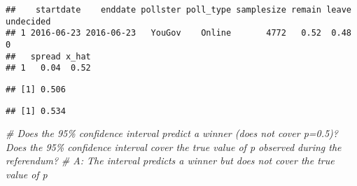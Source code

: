 \documentclass[
]{article}
\newenvironment{Shaded}{\begin{snugshade}}{\end{snugshade}}
\newcommand{\CommentTok}[1]{\textcolor[rgb]{0.56,0.35,0.01}{\textit{#1}}}
\newcommand{\DecValTok}[1]{\textcolor[rgb]{0.00,0.00,0.81}{#1}}
\newcommand{\KeywordTok}[1]{\textcolor[rgb]{0.13,0.29,0.53}{\textbf{#1}}}
\newcommand{\NormalTok}[1]{#1}
\newcommand{\OperatorTok}[1]{\textcolor[rgb]{0.81,0.36,0.00}{\textbf{#1}}}
\newcommand{\StringTok}[1]{\textcolor[rgb]{0.31,0.60,0.02}{#1}}
\begin{document}
\begin{verbatim}
##    startdate    enddate pollster poll_type samplesize remain leave undecided
## 1 2016-06-23 2016-06-23   YouGov    Online       4772   0.52  0.48         0
##   spread x_hat
## 1   0.04  0.52
\end{verbatim}

\begin{Shaded}
\end{Shaded}

\begin{verbatim}
## [1] 0.506
\end{verbatim}

\begin{Shaded}
\end{Shaded}

\begin{verbatim}
## [1] 0.534
\end{verbatim}

\begin{Shaded}
\begin{Highlighting}[]
\CommentTok{\# Does the 95\% confidence interval predict a winner (does not cover p=0.5)? Does the 95\% confidence interval cover the true value of p observed during the referendum?}
\CommentTok{\# A: The interval predicts a winner but does not cover the true value of p}
\end{Highlighting}
\end{Shaded}
\end{document}
